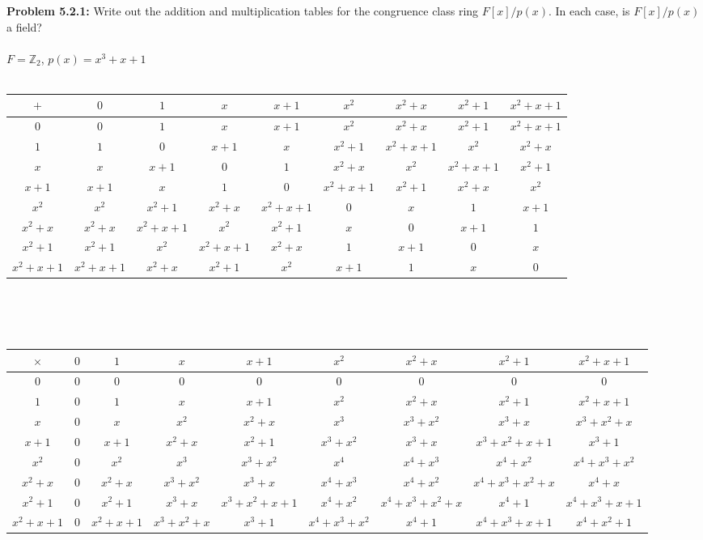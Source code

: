 \documentclass[12pt]{article}
\begin{document}
\noindent \textbf{Problem 5.2.1: }Write out the addition and multiplication tables for the congruence class ring $F[x]/p(x)$. In each case, is $F[x]/p(x)$ a field?
\\ \\
	 $F = \mathbb{Z}_2$, $p(x) = x^3 + x + 1$
			\\ \\
			\scriptsize
			\begin{tabular}{c | c c c c c c c c}
				$+$ & $0$ & $1$ & $x$ & $x + 1$ & $x^2$ & $x^2 + x$ & $x^2 + 1$ & $x^2 + x + 1$ \\
				\hline 
				$0$ & $0$ & $1$ & $x$ & $x + 1$ & $x^2$ & $x^2 + x$ & $x^2 + 1$ & $x^2 + x + 1$ \\
				$1$ & $1$ & $0$ & $x + 1$ & $x$ & $x^2+1$ & $x^2 + x+1$ & $x^2$ & $x^2 + x $ \\
				$x$ & $x$ & $x + 1$ & $0$ & $1$ & $x^2 + x$ & $x^2$ & $x^2 +x +1$ & $x^2 + 1$ \\
				$x + 1$ & $x+1$ & $x$ & $1$ & $0$ & $x^2 + x+1$ & $x^2+1$ & $x^2 +x$ & $x^2 $ \\
				$x^2$ & $x^2$ & $x^2 + 1$ & $x^2 + x$ & $x^2 + x + 1$ & $0$ & $x$ & $1$ & $x + 1$ \\
				$x^2+x$ & $x^2 +x$ & $x^2 +x+1$ & $x^2$ & $x^2 + 1$ & $x$ & $0$ & $x+1$ & $1$ \\
				$x^2 + 1$ & $x^2 +1$ & $x^2$ & $x^2 + x + 1$ & $x^2 + x $ & $1$ & $x + 1$ & $0$ & $x $ \\
				$x^2 +x +1$ & $x^2 +x +1$ & $x^2 +x$ & $x^2+1$ & $x^2$ & $x+1$ & $1$ & $x$ & $0$ \\
			\end{tabular}
			\\ \\ \\
			\begin{tabular}{c | c c c c c c c c}
				$\times$ & $0$ & $1$ & $x$ & $x + 1$ & $x^2$ & $x^2 + x$ & $x^2 + 1$ & $x^2 + x + 1$ \\
				\hline 
				$0$ & $0$ & $0$ & $0$ & $0$ & $0$ & $0$ & $0$ & $0$ \\
				$1$ & $0$ & $1$ & $x$ & $x + 1$ & $x^2$ & $x^2 + x$ & $x^2 + 1$ & $x^2 + x + 1$ \\
				$x$ & $0$ & $x$ & $x^2$ & $x^2 + x$ & $x^3$ & $x^3 + x^2$ & $x^3 + x$ & $x^3 + x^2 + x$ \\
				$x + 1$ & $0$ & $x+1$ & $x^2 + x$ & $x^2 + 1$ & $x^3 + x^2$ & $x^3 + x$ & $x^3 + x^2 + x + 1$ & $x^3 + 1$\\
				$x^2$ & $0$ & $x^2$ & $x^3$ & $x^3 + x^2$ & $x^4$ & $x^4 + x^3$ & $x^4 + x^2$ & $x^4 + x^3 + x^2$\\
				$x^2+x$ & $0$ & $x^2 +x$ & $x^3 + x^2$ & $x^3 + x$ & $x^4 + x^3$ & $x^4 + x^2$ & $x^4 + x^3 + x^2 + x$ & $x^4 + x$\\ 
				$x^2 + 1$ & $0$ & $x^2+1$ & $x^3 + x$ & $x^3 + x^2 + x + 1$ & $x^4 + x^2$ & $x^4 + x^3 + x^2 + x$ & $x^4 + 1$ & $x^4 + x^3 + x + 1$\\
				$x^2 +x +1$ & $0$ & $x^2 +x+1$ & $x^3 + x^2 + x$ & $x^3 + 1$ & $x^4 + x^3 + x^2$ & $x^4 + 1$ & $x^4 + x^3 + x + 1$ & $x^4 + x^2 + 1$\\
			\end{tabular}
\end{document}
